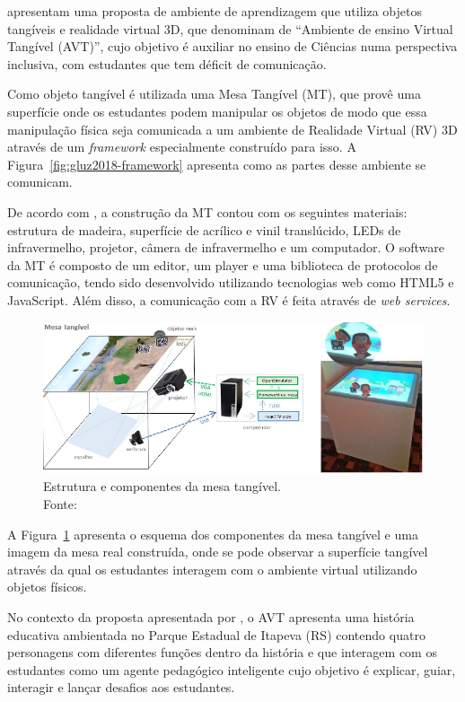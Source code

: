 \cite{gluz:2018} apresentam uma proposta de ambiente de aprendizagem que utiliza objetos tangíveis e realidade virtual 3D, que denominam de ``Ambiente de ensino Virtual Tangível (AVT)'', cujo objetivo é auxiliar no ensino de Ciências numa perspectiva inclusiva, com estudantes que tem déficit de comunicação.

Como objeto tangível é utilizada uma Mesa Tangível (MT), que provê uma superfície onde os estudantes podem manipular os objetos de modo que essa manipulação física seja comunicada a um ambiente de Realidade Virtual (RV) 3D através de um \textit{framework} especialmente construído para isso. A Figura~\ref{fig:gluz2018-framework} apresenta como as partes desse ambiente se comunicam.

De acordo com \cite{gluz:2018}, a construção da MT contou com os seguintes materiais: estrutura de madeira, superfície de acrílico e vinil translúcido, LEDs de infravermelho, projetor, câmera de infravermelho e um computador. O software da MT é composto de um editor, um player e uma biblioteca de protocolos de comunicação, tendo sido desenvolvido utilizando tecnologias web como HTML5 e JavaScript. Além disso, a comunicação com a RV é feita através de \textit{web services}.

\begin{figure}[htb]
	\centering
	\includegraphics[width=0.9\linewidth]{chapters/works/gluz2018-mesa.png}
	\caption{Estrutura e componentes da mesa tangível. \\Fonte:~\cite{gluz:2018}}
	\label{fig:gluz2018-mesa}
\end{figure}

A Figura~\ref{fig:gluz2018-mesa} apresenta o esquema dos componentes da mesa tangível e uma imagem da mesa real construída, onde se pode observar a superfície tangível através da qual os estudantes interagem com o ambiente virtual utilizando objetos físicos. 

No contexto da proposta apresentada por \cite{gluz:2018}, o AVT apresenta uma história educativa ambientada no Parque Estadual de Itapeva (RS) contendo quatro personagens com diferentes funções dentro da história e que interagem com os estudantes como um agente pedagógico inteligente cujo objetivo é explicar, guiar, interagir e lançar desafios aos estudantes.

